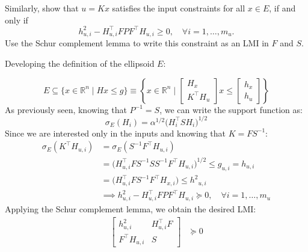 \documentclass[]{article}
\begin{document}
\begin{assignment}\label{sess3:c3}
	Similarly, show that $u = Kx$ satisfies the input constraints for all $x \in E$, 
	if and only if 
	\[ 
		h_{u,i}^2 - H_{u,i}^\top F P F^\top H_{u,i} \geq 0, \quad \forall i = 1, \dots, m_{u}.
	\]
	Use the Schur complement lemma to write this constraint as an LMI in $F$ and $S$.
\end{assignment}
\begin{flushleft}
	Developing the definition of the ellipsoid $E$:
\end{flushleft}
\[ 
    E \subseteq \{x \in \mathbb{R}^n \mid Hx \leq g \} \equiv 
    \left\{ x \in \mathbb{R}^n \mid 
    \begin{bmatrix}
        H_x \\
        K^\top H_u
    \end{bmatrix} x \leq 
    \begin{bmatrix}
        h_x \\
        h_u
    \end{bmatrix} 
    \right\}
\]
As previously seen, knowing that $ P^{-1} = S $, we can write the support function as:
\begin{equation}
	\sigma_E(H_i) = \alpha^{1/2} \Big( H_i^\top S H_i \Big)^{1/2}
\end{equation}
Since we are interested only in the inputs and knowing that $ K = F S^{-1} $:
\begin{equation}
	\begin{aligned}
		\sigma_E(K^\top H_{u,i}) &= \sigma_E(S^{-1} F^\top H_{u,i}) \\
								 &= \Big( H_{u,i}^\top F S^{-1} S S^{-1} F^\top H_{u,i} \Big)^{1/2} \leq g_{u,i} = h_{u,i} \\
								 &= \Big( H_{u,i}^\top F S^{-1} F^\top H_{x,i} \Big) \leq {h^2}_{u,i} \\
								 &\implies h_{u,i}^2 - H_{u,i}^\top F P F^\top H_{u,i} \succeq 0, \quad \forall i = 1, \dots, m_{u}
	\end{aligned}
\end{equation}
Applying the Schur complement lemma, we obtain the desired LMI:
\begin{equation}
	\begin{aligned}
		\begin{bmatrix}
			h_{u,i}^2 & H_{u,i}^\top F \\ 
			F^\top H_{u,i} & S
		\end{bmatrix} &\succeq 0
	\end{aligned}
\end{equation}
\end{document}
